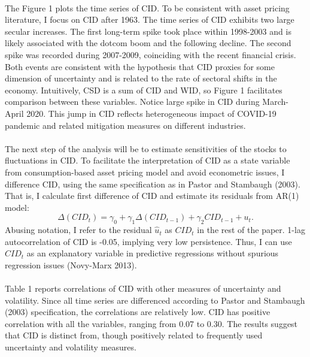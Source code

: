 \documentclass[12pt]{article}
\begin{document}
\paragraph{}
The Figure 1 plots the time series of CID. To be consistent with asset pricing literature, I focus on CID after 1963. The time series of CID exhibits two large secular increases. The first long-term spike took place within 1998-2003 and is likely associated with the dotcom boom and the following decline. The second spike was recorded during 2007-2009, coinciding with the recent financial crisis. Both events are consistent with the hypothesis that CID proxies for some dimension of uncertainty and is related to the rate of sectoral shifts in the economy. Intuitively, CSD is a sum of CID and WID, so Figure 1 facilitates comparison between these variables. Notice large spike in CID during March-April 2020. This jump in CID reflects heterogeneous impact of COVID-19 pandemic and related mitigation measures on different industries. 
\paragraph{}
The next step of the analysis will be to estimate sensitivities of the stocks to fluctuations in CID. To facilitate the interpretation of CID as a state variable from consumption-based asset pricing model and avoid econometric issues, I difference CID, using the same specification as in Pastor and Stambaugh (2003). That is, I calculate first difference of CID and estimate its residuals from AR(1) model:
\begin{equation}
\Delta(CID_t) = \gamma_0 + \gamma_1 \Delta(CID_{t-1}) + \gamma_2 CID_{t-1} + u_t.
\end{equation}
Abusing notation, I refer to the residual $\hat{u}_t$ as $CID_t$ in the rest of the paper. 1-lag autocorrelation of CID is -0.05, implying very low persistence. Thus, I can use $CID_t$ as an explanatory variable in predictive regressions without spurious regression issues (Novy-Marx 2013). 
\paragraph{}
Table 1 reports correlations of CID with other measures of uncertainty and volatility. Since all time series are differenced according to Pastor and Stambaugh (2003) specification, the correlations are relatively low. CID has positive correlation with all the variables, ranging from 0.07 to 0.30. The results suggest that CID is distinct from, though positively related to frequently used uncertainty and volatility measures.
\end{document}
